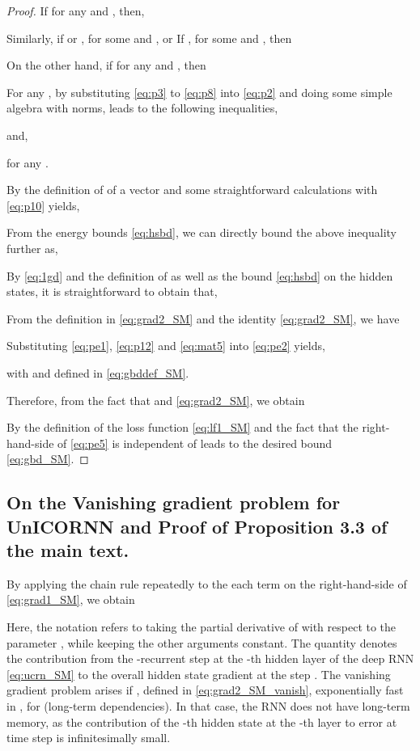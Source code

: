 \documentclass[a4paper]{article}
\begin{document}
\begin{proof}
If for any  and , then,


Similarly, if  or , for some  and , or If , for some  and , then

On the other hand, if for any  and , then

For any , by substituting \eqref{eq:p3} to \eqref{eq:p8} into \eqref{eq:p2} and doing some simple algebra with norms, leads to the following inequalities,

and,

for any .

By the definition of  of a vector and some straightforward calculations with \eqref{eq:p10} yields,

From the energy bounds \eqref{eq:hsbd}, we can directly bound the above inequality further as,


By \eqref{eq:1gd} and the definition of  as well as the bound \eqref{eq:hsbd} on the hidden states, it is straightforward to obtain that,

From the definition in \eqref{eq:grad2_SM} and the identity \eqref{eq:grad2_SM}, we have

Substituting \eqref{eq:pe1}, \eqref{eq:p12} and \eqref{eq:mat5} into \eqref{eq:pe2} yields,

with  and  defined in \eqref{eq:gbddef_SM}.

Therefore, from the fact that  and \eqref{eq:grad2_SM}, we obtain

By the definition of the loss function \eqref{eq:lf1_SM} and the fact that the right-hand-side of \eqref{eq:pe5} is independent of  leads to the desired bound \eqref{eq:gbd_SM}. 







\end{proof}
\subsection{On the Vanishing gradient problem for UnICORNN and Proof of Proposition 3.3 of the main text.}
By applying the chain rule repeatedly to the each term on the right-hand-side of \eqref{eq:grad1_SM}, we obtain 

Here, the notation  refers to taking the partial derivative of  with respect to the parameter , while keeping the other arguments constant.  The quantity  denotes the contribution from the -recurrent step at the -th hidden layer of the deep RNN \eqref{eq:ucrn_SM} to the overall hidden state gradient at the step . The vanishing gradient problem \citep{vanish_grad} arises if , defined in \eqref{eq:grad2_SM_vanish},  exponentially fast in , for  (long-term dependencies). In that case, the RNN does not have long-term memory, as the contribution of the -th hidden state at the -th layer to error at time step  is infinitesimally small. 
\end{document}
